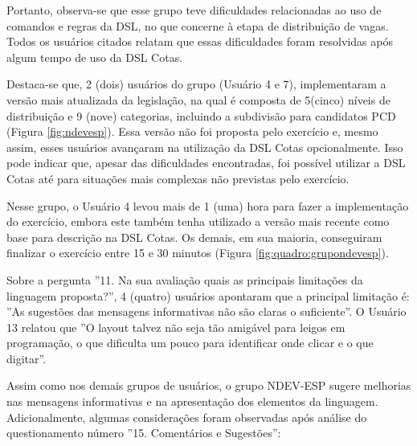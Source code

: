 Portanto, observa-se que esse grupo teve dificuldades relacionadas ao uso de comandos e regras da DSL, no que concerne à etapa de distribuição de vagas. Todos os usuários citados relatam que essas dificuldades foram resolvidas após algum tempo de uso da DSL Cotas.

Destaca-se que, 2 (dois) usuários do grupo (Usuário 4 e 7), implementaram a versão mais atualizada da legislação, na qual é composta de 5(cinco) níveis de distribuição e 9 (nove) categorias, incluindo a subdivisão para candidatos PCD (Figura \ref{fig:ndevesp}). Essa versão não foi proposta pelo exercício e, mesmo assim, esses usuários avançaram na utilização da DSL Cotas opcionalmente. Isso pode indicar que, apesar das dificuldades encontradas, foi possível utilizar a DSL Cotas até para situações mais complexas não previstas pelo exercício.




Nesse grupo, o Usuário 4 levou mais de 1 (uma) hora para fazer a implementação do exercício, embora este também tenha utilizado a versão mais recente como base para descrição na DSL Cotas. Os demais, em sua maioria, conseguiram finalizar o exercício entre 15 e 30 minutos (Figura \ref{fig:quadro:grupondevesp}).



Sobre a pergunta ''11. Na sua avaliação quais as principais limitações da linguagem proposta?'', 4 (quatro) usuários apontaram que a principal limitação é: ''As sugestões das mensagens informativas não são claras o suficiente''. O Usuário 13 relatou que ''O layout talvez não seja tão amigável para leigos em programação, o que dificulta um pouco para identificar onde clicar e o que digitar''.

\newpage
Assim como nos demais grupos de usuários, o grupo NDEV-ESP sugere melhorias nas mensagens informativas e na apresentação dos elementos da linguagem. Adicionalmente, algumas considerações foram observadas após análise do questionamento número ''15. Comentários e Sugestões'':

